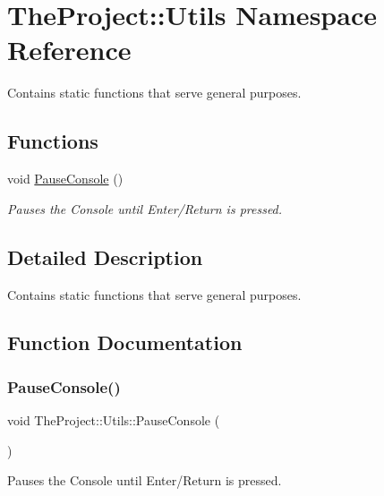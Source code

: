 \hypertarget{namespace_the_project_1_1_utils}{}\section{The\+Project\+:\+:Utils Namespace Reference}
\label{namespace_the_project_1_1_utils}


Contains static functions that serve general purposes.  


\subsection*{Functions}
\begin{DoxyCompactItemize}
\item 
void \mbox{\hyperlink{namespace_the_project_1_1_utils_adcca61503685de20b939833929896854}{Pause\+Console}} ()
\begin{DoxyCompactList}\small\item\em Pauses the Console until Enter/\+Return is pressed. \end{DoxyCompactList}\end{DoxyCompactItemize}


\subsection{Detailed Description}
Contains static functions that serve general purposes. 

\subsection{Function Documentation}
\mbox{\label{namespace_the_project_1_1_utils_adcca61503685de20b939833929896854}} 
\subsubsection{\texorpdfstring{Pause\+Console()}{PauseConsole()}}
{\footnotesize\ttfamily void The\+Project\+::\+Utils\+::\+Pause\+Console (\begin{DoxyParamCaption}{ }\end{DoxyParamCaption})}



Pauses the Console until Enter/\+Return is pressed. 

